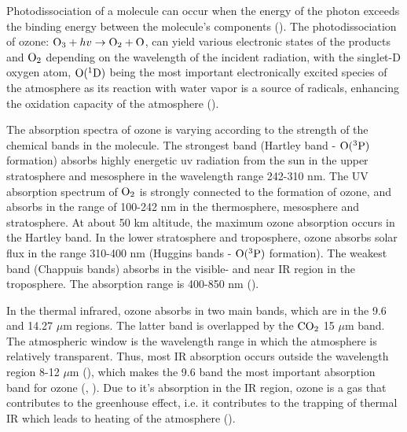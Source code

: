 Photodissociation of a molecule can occur when the energy of the photon exceeds the binding energy between the molecule's components (\cite{SeinfeldSpyros}). The photodissociation of ozone: $\mathrm{O_3} + hv \rightarrow \mathrm{O_2} + \mathrm{O}$, can yield various electronic states of the products  and $\mathrm{O_2}$ depending on the wavelength of the incident radiation, with the singlet-D oxygen atom, $\mathrm{O}(^1\mathrm{D})$ being the most important electronically excited species of the atmosphere as its reaction with water vapor is a source of  radicals, enhancing the oxidation capacity of the atmosphere (\cite{SeinfeldSpyros}).


\medskip

The absorption spectra of ozone is varying according to the strength of the chemical bands in the molecule. The strongest band (Hartley band - $\mathrm{O(^3P)}$ formation) absorbs highly energetic \acrfull{uv} radiation from the sun in the upper stratosphere and mesosphere in the wavelength range 242-310 nm. The UV absorption spectrum of $\mathrm{O_2}$ is strongly connected to the formation of ozone, and absorbs in the range of 100-242 nm in the thermosphere, mesosphere and stratosphere. At about 50 km altitude, the maximum ozone absorption occurs in the Hartley band. In the lower stratosphere and troposphere, ozone absorbs solar flux in the range 310-400 nm (Huggins bands - $\mathrm{O(^3P)}$ formation). The weakest band (Chappuis bands) absorbs in the visible- and near IR region in the troposphere. The absorption range is 400-850 nm (\cite{Liou_AtmRad}). 



\medskip 

In the thermal infrared, ozone absorbs in two main bands, which are in the 9.6 and 14.27 $\mu$m regions. The latter band is overlapped by the $\mathrm{CO_2}$ 15 $\mu$m band. The atmospheric window is the wavelength range in which the atmosphere is relatively transparent. Thus, most IR absorption occurs outside the wavelength region 8-12 $\mu$m (\cite{AtmModFund}), which makes the 9.6 band the most important absorption band for ozone (\cite{Liou_AtmRad}, \cite{Myhre1997}). Due to it's absorption in the IR region, ozone is a gas that contributes to the greenhouse effect, i.e. it contributes to the trapping of thermal IR which leads to heating of the atmosphere (\cite{Liou_AtmRad}).

\medskip


